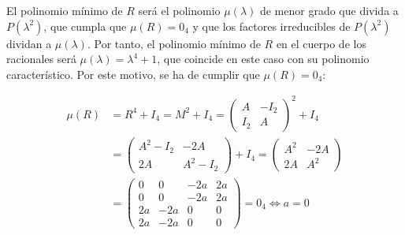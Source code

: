 \documentclass[../../main.tex]{subfiles}
\begin{document}
  El polinomio mínimo de $R$ será el polinomio $\mu(\lambda)$ de menor grado que divida a $P(\lambda^2)$, que cumpla que $\mu(R) = 0_4$ y que los factores irreducibles de $P(\lambda^2)$ dividan a $\mu(\lambda)$. Por tanto, el polinomio mínimo de $R$ en el cuerpo de los racionales será $\mu(\lambda) = \lambda^4 + 1$, que coincide en este caso con su polinomio característico. Por este motivo, se ha de cumplir que $\mu(R) = 0_4$:

  \begin{equation*}
    \begin{split}
      \mu(R) & = R^4 + I_4 = M^2 + I_4 =
      \begin{pmatrix}
        A & -I_2 \\
        I_2 & A
      \end{pmatrix}
      ^2 + I_4 \\ & =
      \begin{pmatrix}
        A^2 - I_2 & -2 A \\
        2 A & A^2 - I_2
      \end{pmatrix}
      + I_4 =
      \begin{pmatrix}
        A^2 & -2 A \\
        2 A & A^2
      \end{pmatrix}
      \\ & =
      \begin{pmatrix}
        0 & 0 & -2a & 2a \\
        0 & 0 & -2a & 2a \\
        2a & -2a & 0 & 0 \\
        2a & -2a & 0 & 0
      \end{pmatrix}
      = 0_4 \iff a = 0
    \end{split}
  \end{equation*}
\end{document}
